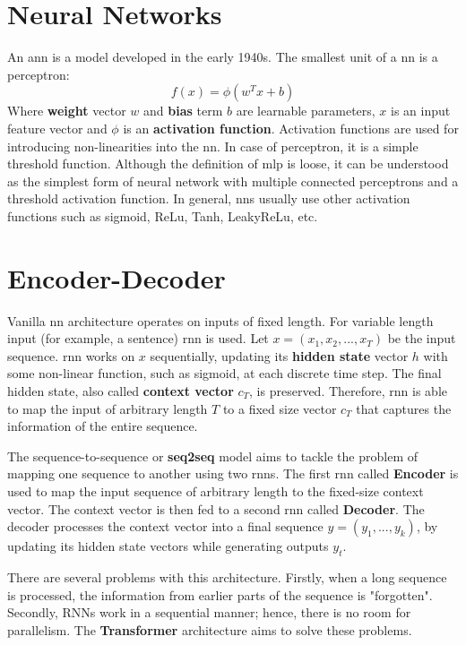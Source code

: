 \section{Neural Networks}
An \Gls{ann} is a model developed in the early 1940s. The smallest unit of a \Gls{nn} is a perceptron:
\begin{equation}
    f(x) = \phi(w^Tx + b)
\end{equation}
Where \textbf{weight} vector $w$ and \textbf{bias} term $b$ are learnable parameters, $x$ is an input feature vector and $\phi$ is an \textbf{activation function}. Activation functions are used for introducing non-linearities into the \Gls{nn}. In case of perceptron, it is a simple threshold function. Although the definition of \Gls{mlp} is loose, it can be understood as the simplest form of neural network with multiple connected perceptrons and a threshold activation function. In general, \Gls{nn}s usually use other activation functions such as sigmoid, ReLu, Tanh, LeakyReLu, etc.





\section{Encoder-Decoder}
Vanilla \Gls{nn} architecture operates on inputs of fixed length. For variable length input (for example, a sentence) \Gls{rnn} is used. Let $x = (x_1,x_2,...,x_T)$ be the input sequence. \gls{rnn} works on $x$ sequentially, updating its \textbf{hidden state} vector $h$ with some non-linear function, such as sigmoid, at each discrete time step. The final hidden state, also called \textbf{context vector} $c_T$, is preserved.
Therefore, \Gls{rnn} is able to map the input of arbitrary length $T$ to a fixed size vector $c_T$ that captures the information of the entire sequence.

The sequence-to-sequence \cite{sutskever2014sequence,cho2014learning} or \textbf{seq2seq} model aims to tackle the problem of mapping one sequence to another using two \Gls{rnn}s. The first \Gls{rnn} called \textbf{Encoder} is used to map the input sequence of arbitrary length to the fixed-size context vector. The context vector is then fed to a second \Gls{rnn} called \textbf{Decoder}. The decoder processes the context vector into a final sequence $y = (y_1,...,y_k)$, by updating its hidden state vectors while generating outputs $y_t$.

There are several problems with this architecture. Firstly, when a long sequence is processed, the information from earlier parts of the sequence is "forgotten". Secondly, RNNs work in a sequential manner; hence, there is no room for parallelism. The \textbf{Transformer} architecture aims to solve these problems.





